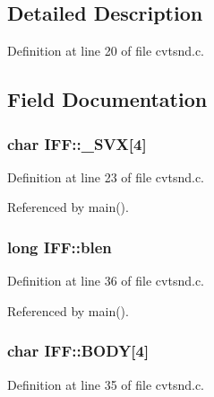 \subsection{Detailed Description}


Definition at line 20 of file cvtsnd.\+c.



\subsection{Field Documentation}
\hypertarget{structIFF_ae2e66f43d027e5ee6b664d30e518da17}{
\subsubsection[{\+\_\+8\+S\+V\+X}]{\setlength{\rightskip}{0pt plus 5cm}char I\+F\+F\+::\+\_\+S\+V\+X\mbox{[}4\mbox{]}}}\label{structIFF_ae2e66f43d027e5ee6b664d30e518da17}


Definition at line 23 of file cvtsnd.\+c.



Referenced by main().

\hypertarget{structIFF_a3fc73472318cc9e5eff0309d223d1009}{
\subsubsection[{blen}]{\setlength{\rightskip}{0pt plus 5cm}long I\+F\+F\+::blen}}\label{structIFF_a3fc73472318cc9e5eff0309d223d1009}


Definition at line 36 of file cvtsnd.\+c.



Referenced by main().

\hypertarget{structIFF_aff26572bfbef65efe24439dfd15ecdca}{
\subsubsection[{B\+O\+D\+Y}]{\setlength{\rightskip}{0pt plus 5cm}char I\+F\+F\+::\+B\+O\+D\+Y\mbox{[}4\mbox{]}}}\label{structIFF_aff26572bfbef65efe24439dfd15ecdca}


Definition at line 35 of file cvtsnd.\+c.



